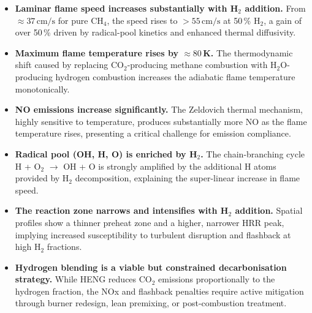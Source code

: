 \documentclass[12pt,a4paper]{article}
\begin{document}
\begin{itemize}
  \item \textbf{Laminar flame speed increases substantially with H$_2$ addition.}
        From $\approx\!37\,\mathrm{cm/s}$ for pure CH$_4$, the speed rises to
        $>\!55\,\mathrm{cm/s}$ at 50\,\% H$_2$, a gain of over 50\,\% driven by
        radical-pool kinetics and enhanced thermal diffusivity.

  \item \textbf{Maximum flame temperature rises by $\approx\!80$\,K.}
        The thermodynamic shift caused by replacing CO$_2$-producing methane
        combustion with H$_2$O-producing hydrogen combustion increases the
        adiabatic flame temperature monotonically.

  \item \textbf{NO emissions increase significantly.}
        The Zeldovich thermal mechanism, highly sensitive to temperature, produces
        substantially more NO as the flame temperature rises, presenting a critical
        challenge for emission compliance.

  \item \textbf{Radical pool (OH, H, O) is enriched by H$_2$.}
        The chain-branching cycle H + O$_2$ $\rightarrow$ OH + O is strongly
        amplified by the additional H atoms provided by H$_2$ decomposition,
        explaining the super-linear increase in flame speed.

  \item \textbf{The reaction zone narrows and intensifies with H$_2$ addition.}
        Spatial profiles show a thinner preheat zone and a higher, narrower HRR
        peak, implying increased susceptibility to turbulent disruption and
        flashback at high H$_2$ fractions.

  \item \textbf{Hydrogen blending is a viable but constrained decarbonisation
        strategy.}
        While HENG reduces CO$_2$ emissions proportionally to the hydrogen
        fraction, the NOx and flashback penalties require active mitigation
        through burner redesign, lean premixing, or post-combustion treatment.
\end{itemize}

\end{document}
